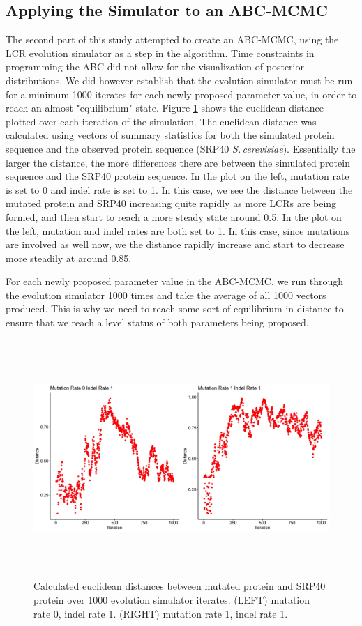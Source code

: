\documentclass[10pt]{article}
\providecommand{\figref}[1]{Figure \ref{#1}}  %
\newcommand{\scshrt}{\mbox{\textit{S.\,cerevisiae}}\xspace}
\begin{document}
\subsection{Applying the Simulator to an ABC-MCMC}

The second part of this study attempted to create an ABC-MCMC, using the LCR evolution simulator as a step in the algorithm. Time constraints in programming the ABC did not allow for the visualization of posterior distributions. We did however establish that the evolution simulator must be run for a minimum 1000 iterates for each newly proposed parameter value, in order to reach an almost "equilibrium" state. \figref{fig:5} shows the euclidean distance plotted over each iteration of the simulation. The euclidean distance was calculated using vectors of summary statistics for both the simulated protein sequence and the observed protein sequence (SRP40 \scshrt). Essentially the larger the distance, the more differences there are between the simulated protein sequence and the SRP40 protein sequence. In the plot on the left, mutation rate is set to 0 and indel rate is set to 1. In this case, we see the distance between the mutated protein and SRP40 increasing quite rapidly as more LCRs are being formed, and then start to reach a more steady state around 0.5. In the plot on the left, mutation and indel rates are both set to 1. In this case, since mutations are involved as well now, we the distance rapidly increase and start to decrease more steadily at around 0.85.

For each newly proposed parameter value in the ABC-MCMC, we run through the evolution simulator 1000 times and take the average of all 1000 vectors produced. This is why we need to reach some sort of equilibrium in distance to ensure that we reach a level status of both parameters being proposed.

\begin{figure}[H]
	\includegraphics[width=18cm, height=9cm]{distances.jpeg}
	\caption{Calculated euclidean distances between mutated protein and SRP40 protein over 1000 evolution simulator iterates. (LEFT) mutation rate 0, indel rate 1. (RIGHT) mutation rate 1, indel rate 1.}
	\label{fig:5}
\end{figure}
\newpage
\end{document}
